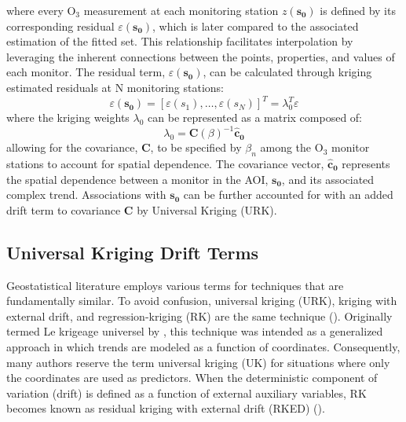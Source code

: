 where every O$_3$ measurement at each monitoring station $z(\mathbf{s}_\mathbf{0})$ is defined by its corresponding residual $\varepsilon(\mathbf{s}_\mathbf{0})$, which is later compared to the associated estimation of the fitted set. This relationship facilitates interpolation by leveraging the inherent connections between the points, properties, and values of each monitor. The residual term, $\varepsilon\left(\mathbf{s}_\mathbf{0}\right)$, can be calculated through kriging estimated residuals at N monitoring stations:
\[
\varepsilon\left(\mathbf{s}_\mathbf{0}\right)=\left[\varepsilon\left(s_1\right),\ldots,\varepsilon\left(s_N\right)\right]^T=\lambda_0^T\varepsilon
\]
where the kriging weights $\lambda_0$ can be represented as a matrix composed of: 
\[
\lambda_0={\mathbf{C}(\beta)}^{-1}\mathbf{\hat{c}}_{\mathbf{0}}
\]
allowing for the covariance, $\mathbf{C}$, to be specified by $\beta_n$ among the O$_3$ monitor stations to account for spatial dependence. The covariance vector, $\mathbf{\hat{c}}_{\mathbf{0}}$ represents the spatial dependence between a monitor in the AOI, $\mathbf{s}_\mathbf{0}$, and its associated complex trend. Associations with $\mathbf{s}_\mathbf{0}$ can be further accounted for with an added drift term to covariance $\mathbf{C}$ by Universal Kriging (URK). 
\subsection{Universal Kriging Drift Terms} \label{methods:urkt} Geostatistical literature employs various terms for techniques that are fundamentally similar. To avoid confusion, universal kriging (URK), kriging with external drift, and regression-kriging (RK) are the same technique (\cite{webster2007}). Originally termed Le krigeage universel by \textcite{matheron1969krigeage}, this technique was intended as a generalized approach in which trends are modeled as a function of coordinates. Consequently, many authors reserve the term universal kriging (UK) for situations where only the coordinates are used as predictors. When the deterministic component of variation (drift) is defined as a function of external auxiliary variables, RK becomes known as residual kriging with external drift (RKED) (\cite{hengl2004}). 

